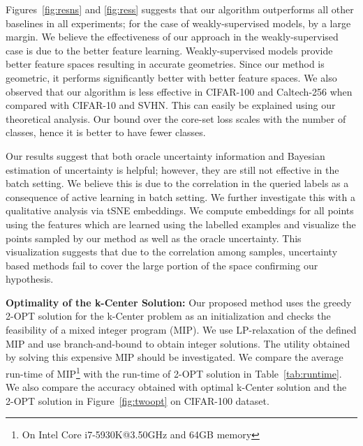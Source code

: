 \documentclass{article} %
\begin{document}
Figures~\ref{fig:resns} and \ref{fig:ress} suggests that our algorithm outperforms all other baselines in all
experiments; for the case of weakly-supervised models, by a large margin. We believe the effectiveness of our approach
in the weakly-supervised case is due to the better feature learning. Weakly-supervised models provide better feature
spaces resulting in accurate geometries. Since our method is geometric, it performs significantly better with better
feature spaces. We also observed that our algorithm is less effective in CIFAR-100 and Caltech-256 when compared with
CIFAR-10 and SVHN. This can easily be explained using our theoretical analysis. Our bound over the core-set loss scales with the
number of classes, hence it is better to have fewer classes. 

Our results suggest that both oracle uncertainty information and Bayesian estimation of uncertainty is helpful; however,
they are still not effective in the batch setting. We believe this is due to the correlation in the queried labels as a
consequence of active learning in batch setting. We further investigate this with a qualitative analysis via
tSNE \citep{tsne} embeddings. We compute embeddings for all points using the features which are learned using the
labelled examples and visualize the points sampled by our method as well as the oracle uncertainty. This visualization
suggests that due to the correlation among samples, uncertainty based methods fail to cover the large portion of the
space confirming our hypothesis.



\noindent\textbf{Optimality of the k-Center Solution:} Our proposed method uses the greedy 2-OPT solution for the
k-Center problem as an initialization and checks the feasibility of a mixed integer program (MIP). We use
LP-relaxation of the defined MIP and use branch-and-bound to obtain integer solutions. The utility obtained by solving
this expensive MIP should be investigated. We compare the average run-time of MIP\footnote{On Intel Core
i7-5930K@3.50GHz and 64GB memory} with the run-time of 2-OPT solution in Table~\ref{tab:runtime}. We also compare the
accuracy obtained with optimal k-Center solution and the 2-OPT solution in Figure~\ref{fig:twoopt} on CIFAR-100 dataset.
\end{document}
